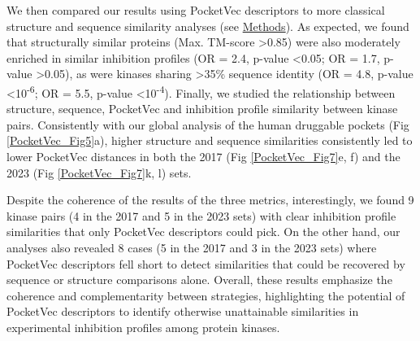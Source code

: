We then compared our results using PocketVec descriptors to more classical structure and sequence similarity analyses (see \hyperref[PocketVec_Methods]{Methods}). As expected, we found that structurally similar proteins (Max. TM-score >0.85) were also moderately enriched in similar inhibition profiles (OR = 2.4, p-value <0.05; OR = 1.7, p-value >0.05), as were kinases sharing >35\% sequence identity (OR = 4.8, p-value <10\textsuperscript{-6}; OR = 5.5, p-value <10\textsuperscript{-4}). Finally, we studied the relationship between structure, sequence, PocketVec and inhibition profile similarity between kinase pairs. Consistently with our global analysis of the human druggable pockets (Fig \ref{PocketVec_Fig5}a), higher structure and sequence similarities consistently led to lower PocketVec distances in both the 2017 (Fig \ref{PocketVec_Fig7}e, f) and the 2023 (Fig \ref{PocketVec_Fig7}k, l) sets.

Despite the coherence of the results of the three metrics, interestingly, we found 9 kinase pairs (4 in the 2017 and 5 in the 2023 sets) with clear inhibition profile similarities that only PocketVec descriptors could pick. On the other hand, our analyses also revealed 8 cases (5 in the 2017 and 3 in the 2023 sets) where PocketVec descriptors fell short to detect similarities that could be recovered by sequence or structure comparisons alone. Overall, these results emphasize the coherence and complementarity between strategies, highlighting the potential of PocketVec descriptors to identify otherwise unattainable similarities in experimental inhibition profiles among protein kinases. 
